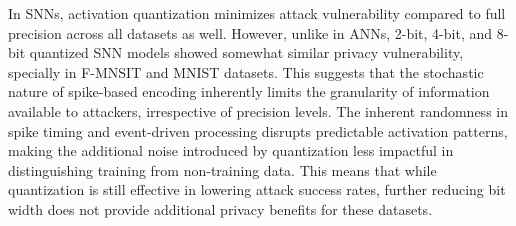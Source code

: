 In SNNs, activation quantization minimizes attack vulnerability compared to full precision across all datasets as well. However, unlike in ANNs,  2-bit, 4-bit, and 8-bit quantized SNN models showed  somewhat similar privacy vulnerability, specially in F-MNSIT and MNIST datasets. This suggests that the stochastic nature of spike-based encoding inherently limits the granularity of information available to attackers, irrespective of precision levels. The inherent randomness in spike timing and event-driven processing disrupts predictable activation patterns, making the additional noise introduced by quantization less impactful in distinguishing training from non-training data. This means that while quantization is still effective in lowering attack success rates, further reducing bit width does not provide additional privacy benefits for these datasets.







